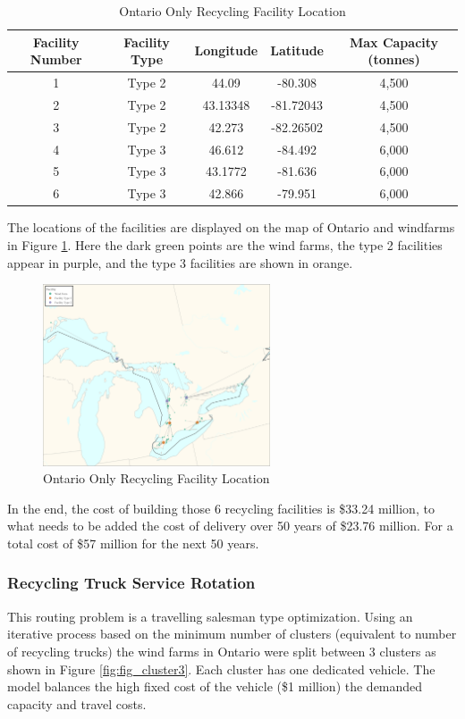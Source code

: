 \begin{table}[h]
    \centering
    \begin{tabular}{c c | c c c } \hline
     Facility Number & Facility Type & Longitude & Latitude & Max Capacity (tonnes) \\ \hline\hline
     1 & Type 2 & 44.09 & -80.308 & 4,500\\ 
     2 & Type 2 & 43.13348 & -81.72043 & 4,500\\
     3 & Type 2 & 42.273 & -82.26502 & 4,500\\
     4 & Type 3 & 46.612 & -84.492 & 6,000\\
     5 & Type 3 & 43.1772 & -81.636 & 6,000\\ 
     6 & Type 3 & 42.866 & -79.951 & 6,000 \\ \hline
    \end{tabular}
    \caption{Ontario Only Recycling Facility Location}
    \label{table:on_fl}
\end{table}

The locations of the facilities are displayed on the map of Ontario and windfarms in Figure \ref{fig:fig_on}. Here the dark green points are the wind farms, the type 2 facilities appear in purple, and the type 3 facilities are shown in orange.  
\begin{figure} [h]
    \centering
    \includegraphics[width=0.6\textwidth]{graphics/fig_on.jpeg}
    \caption{Ontario Only Recycling Facility Location}
    \label{fig:fig_on}
\end{figure}

In the end, the cost of building those 6 recycling facilities is \$33.24 million, to what needs to be added the cost of delivery over 50 years of \$23.76 million. For a total cost of \$57 million for the next 50 years. 




\subsubsection{Recycling Truck Service Rotation}
This routing problem is a travelling salesman type optimization. Using an iterative process based on the minimum number of clusters (equivalent to number of recycling trucks) the wind farms in Ontario were split between 3 clusters as shown in Figure \ref{fig:fig_cluster3}.  Each cluster has one dedicated vehicle. The model balances the high fixed cost of the vehicle (\$1 million) the demanded capacity and travel costs. 


